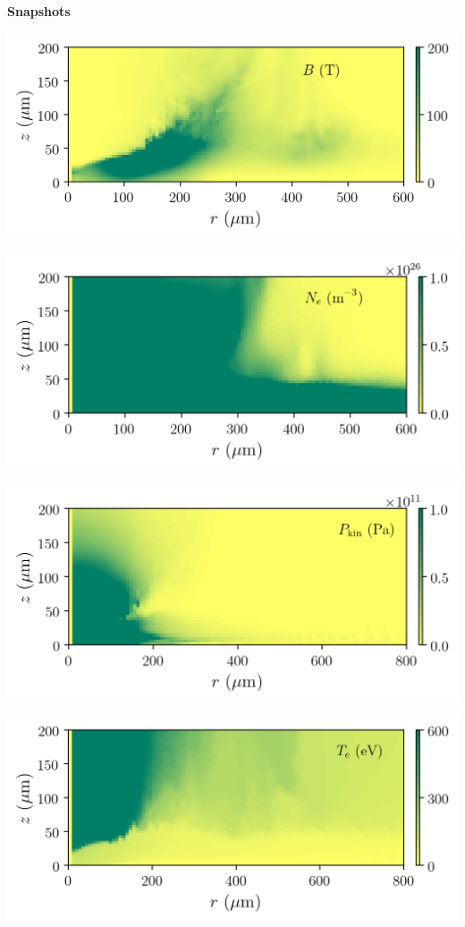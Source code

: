 \documentclass{report}
\begin{document}
{\bf Snapshots}

\begin{center}
\includegraphics[width=0.8\linewidth]{luli2015_Au-B.png}
\end{center}

\begin{center}
\includegraphics[width=0.8\linewidth]{luli2015_Au-Ne.png}
\end{center}

\begin{center}
\includegraphics[width=0.8\linewidth]{luli2015_Au-P.png}
\end{center}

\begin{center}
\includegraphics[width=0.8\linewidth]{luli2015_Au-Te.png}
\end{center}
\end{document}
